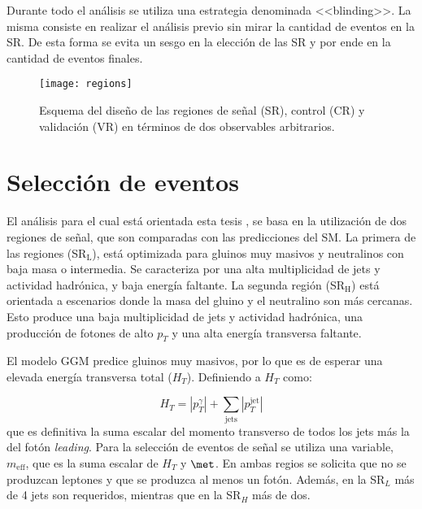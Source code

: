Durante todo el análisis se utiliza una estrategia denominada <<blinding>>. La misma consiste en realizar el análisis previo sin mirar la cantidad de eventos en la SR. De esta forma se evita un sesgo en la elección de las SR y por ende en la cantidad de eventos finales.

\begin{figure}
\centering
\texttt{[image: regions]}
\caption{Esquema del diseño de las regiones de señal (SR), control (CR) y validación (VR) en términos de dos observables arbitrarios.}
\label{regions}
\end{figure}

\section{Selección de eventos}

El análisis para el cual está orientada esta tesis \cite{Collaboration:2198651}, se basa en la utilización de dos regiones de señal, que son comparadas con las predicciones del SM. La primera de las regiones (SR$_{\text{L}}$), está optimizada para gluinos muy masivos y neutralinos con baja masa o intermedia. Se caracteriza por una alta multiplicidad de jets y actividad hadrónica, y baja energía faltante. La segunda región (SR$_{\text{H}}$) está orientada a escenarios donde la masa del gluino y el neutralino son más cercanas. Esto produce una baja multiplicidad de jets y actividad hadrónica, una producción de fotones de alto $p_{T}$ y una alta energía transversa faltante.

El modelo GGM predice gluinos muy masivos, por lo que es de esperar una elevada energía transversa total ($H_{T}$). Definiendo a $H_{T}$ como:

\begin{equation}
H_{T}=|p_{T}^{\gamma}|+\sum_{\text{jets}}|p_{T}^{\text{jet}}|
\end{equation} 
que es definitiva la suma escalar del momento transverso de todos los jets más la del fotón \textit{leading}. Para la selección de eventos de señal se utiliza una variable, $m_{\text{eff}}$, que es la suma escalar de $H_{T}$ y $\met$. En ambas regios se solicita que no se produzcan leptones y que se produzca al menos un fotón. Además, en la SR$_{L}$ más de 4 jets son requeridos, mientras que en la SR$_{H}$ más de dos.

